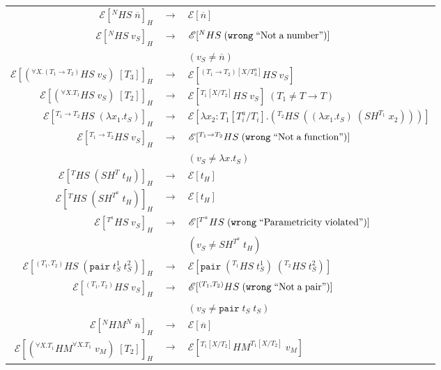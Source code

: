\begin{figure}
\onehalfspacing
\begin{center}
\begin{tabular}{rcl}
$\mathscr{E}[^{N}HS\;\overline{n}]_{H}$ & $\rightarrow$ & $\mathscr{E}[\overline{n}]$ \\
$\mathscr{E}[^{N}HS\;v_{S}]_{H}$ & $\rightarrow$ & $\mathscr{E}[^{N}HS\;(\mathtt{wrong}\;\mathrm{``Not\;a\;number"})]$ \\
&& $(v_{S}\neq\overline{n})$ \\
$\mathscr{E}[(^{\forall X.(T_{1}\rightarrow T_{2})}HS\;v_{S})\;[T_{3}]]_{H}$ & $\rightarrow$ & $\mathscr{E}[^{(T_{1}\rightarrow T_{2})[X/T^{a}_{3}]}HS\;v_{S}]$ \\
$\mathscr{E}[(^{\forall X.T_{1}}HS\;v_{S})\;[T_{2}]]_{H}$ & $\rightarrow$ & $\mathscr{E}[^{T_{1}[X/T_{2}]}HS\;v_{S}]\;(T_{1}\neq T\rightarrow T)$ \\
$\mathscr{E}[^{T_{1}\rightarrow T_{2}}HS\;(\lambda x_{1}.t_{S})]_{H}$ & $\rightarrow$ & $\mathscr{E}[\lambda x_{2}:T_{1}[T^{a}_{i}/T_{i}].(^{T_{2}}HS\;((\lambda x_{1}.t_{S})\;(SH^{T_{1}}\;x_{2})))]$ \\
$\mathscr{E}[^{T_{1}\rightarrow T_{2}}HS\;v_{S}]_{H}$ & $\rightarrow$ & $\mathscr{E}[^{T_{1}\rightarrow T_{2}}HS\;(\mathtt{wrong}\;\mathrm{``Not\;a\;function"})]$ \\
&& $(v_{S}\neq\lambda x.t_{S})$ \\
$\mathscr{E}[^{T}HS\;(SH^{T}\;t_{H})]_{H}$ & $\rightarrow$ & $\mathscr{E}[t_{H}]$ \\
$\mathscr{E}[^{T}HS\;(SH^{T^{a}}\;t_{H})]_{H}$ & $\rightarrow$ & $\mathscr{E}[t_{H}]$ \\
$\mathscr{E}[^{T^{a}}HS\;v_{S}]_{H}$ & $\rightarrow$ & $\mathscr{E}[^{T^{a}}HS\;(\mathtt{wrong}\;\mathrm{``Parametricity\;violated"})]$ \\
&& $(v_{S}\neq SH^{T^{a}}\;t_{H})$ \\
$\mathscr{E}[^{(T_{1},T_{2})}HS\;(\mathtt{pair}\;t_{S}^{1}\;t_{S}^{2})]_{H}$ & $\rightarrow$ & $\mathscr{E}[\mathtt{pair}\;(^{T_{1}}HS\;t_{S}^{1})\;(^{T_{2}}HS\;t_{S}^{2})]$ \\
$\mathscr{E}[^{(T_{1},T_{2})}HS\;v_{S}]_{H}$ & $\rightarrow$ & $\mathscr{E}[^{(T_{1},T_{2})}HS\;(\mathtt{wrong}\;\mathrm{``Not\;a\;pair"})]$ \\
&& $(v_{S}\neq\mathtt{pair}\;t_{S}\;t_{S})$ \\
$\mathscr{E}[^{N}HM^{N}\;\overline{n}]_{H}$ & $\rightarrow$ & $\mathscr{E}[\overline{n}]$ \\
$\mathscr{E}[(^{\forall X.T_{1}}HM^{\forall X.T_{1}}\;v_{M})\;[T_{2}]]_{H}$ & $\rightarrow$ & $\mathscr{E}[^{T_{1}[X/T_{2}]}HM^{T_{1}[X/T_{2}]}\;v_{M}]$ \\

\end{tabular}
\end{center}
\end{figure}
